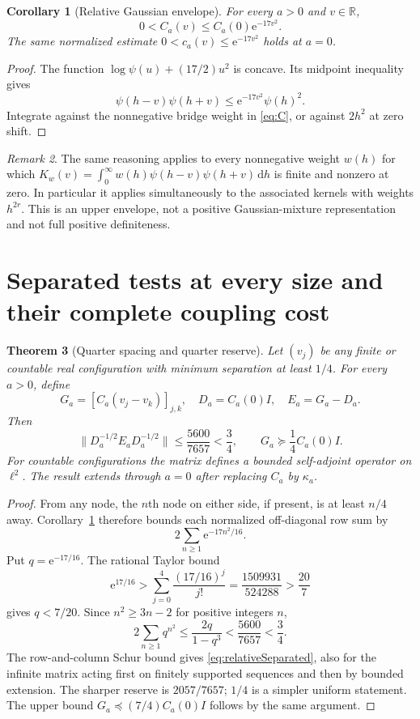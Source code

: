 \documentclass[11pt,letterpaper]{article}
\numberwithin{equation}{section}
\newtheorem{theorem}{Theorem}[section]
\newtheorem{corollary}[theorem]{Corollary}
\theoremstyle{remark}\newtheorem{remark}[theorem]{Remark}
\newcommand{\R}{\mathbb R}
\newcommand{\dd}{\,\mathrm d}
\newcommand{\ee}{\mathrm e}
\begin{document}
\begin{corollary}[Relative Gaussian envelope]\label{cor:envelope}
For every $a>0$ and $v\in\R$,
\begin{equation}\label{eq:envelope}
\boxed{0<C_a(v)\le C_a(0)\ee^{-17v^2}.}
\end{equation}
The same normalized estimate $0<c_a(v)\le\ee^{-17v^2}$ holds at $a=0$.
\end{corollary}
\begin{proof}
The function $\log\psi(u)+(17/2)u^2$ is concave. Its midpoint inequality gives
\[
\psi(h-v)\psi(h+v)\le\ee^{-17v^2}\psi(h)^2.
\]
Integrate against the nonnegative bridge weight in \eqref{eq:C}, or against $2h^2$ at zero shift.
\end{proof}

\begin{remark}
The same reasoning applies to every nonnegative weight $w(h)$ for which
$K_w(v)=\int_0^\infty w(h)\psi(h-v)\psi(h+v)\dd h$ is finite and nonzero at zero. In particular it applies simultaneously to the associated kernels with weights $h^{2r}$. This is an upper envelope, not a positive Gaussian-mixture representation and not full positive definiteness.
\end{remark}

\section{Separated tests at every size and their complete coupling cost}
\begin{theorem}[Quarter spacing and quarter reserve]\label{thm:separated}
Let $(v_j)$ be any finite or countable real configuration with minimum separation at least $1/4$. For every $a>0$, define
\[
G_a=[C_a(v_j-v_k)]_{j,k},\quad D_a=C_a(0)I,\quad E_a=G_a-D_a.
\]
Then
\begin{equation}\label{eq:relativeSeparated}
\boxed{\|D_a^{-1/2}E_aD_a^{-1/2}\|
\le\frac{5600}{7657}<\frac34,\qquad
G_a\succeq\frac14C_a(0)I.}
\end{equation}
For countable configurations the matrix defines a bounded self-adjoint operator on $\ell^2$. The result extends through $a=0$ after replacing $C_a$ by $\kappa_a$.
\end{theorem}
\begin{proof}
From any node, the $n$th node on either side, if present, is at least $n/4$ away. Corollary~\ref{cor:envelope} therefore bounds each normalized off-diagonal row sum by
\[
2\sum_{n\ge1}\ee^{-17n^2/16}.
\]
Put $q=\ee^{-17/16}$. The rational Taylor bound
\[
\ee^{17/16}>\sum_{j=0}^4\frac{(17/16)^j}{j!}
=\frac{1509931}{524288}>\frac{20}{7}
\]
gives $q<7/20$. Since $n^2\ge3n-2$ for positive integers $n$,
\begin{equation}
2\sum_{n\ge1}q^{n^2}\le\frac{2q}{1-q^3}
<\frac{5600}{7657}<\frac34.
\end{equation}
The row-and-column Schur bound gives \eqref{eq:relativeSeparated}, also for the infinite matrix acting first on finitely supported sequences and then by bounded extension. The sharper reserve is $2057/7657$; $1/4$ is a simpler uniform statement. The upper bound $G_a\preceq(7/4)C_a(0)I$ follows by the same argument.
\end{proof}
\end{document}
